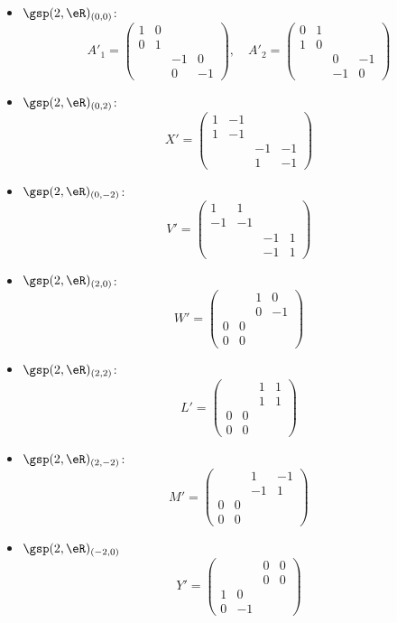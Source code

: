 \begin{itemize}
\item $\gsp(2,\eR)_{(0,0)}$:
\[ 
  A'_1=
\begin{pmatrix}
1&0\\
0&1\\
&&-1&0\\
&&0&-1
\end{pmatrix},
\quad
A'_2=
\begin{pmatrix}
0&1\\
1&0\\
&&0&-1\\
&&-1&0
\end{pmatrix}
\]
\item $\gsp(2,\eR)_{(0,2)}$:
\[ 
 X'= \begin{pmatrix}
1&-1&\\
1&-1&\\
&&-1&-1\\
&&1&-1
\end{pmatrix}
\]
\item $\gsp(2,\eR)_{(0,-2)}$:
\[ 
 V'= \begin{pmatrix}
1&1\\
-1&-1\\
&&-1&1\\
&&-1&1
\end{pmatrix}
\]
\item $\gsp(2,\eR)_{(2,0)}$:
\[ 
 W'= \begin{pmatrix}
&&1&0\\
&&0&-1\\
0&0\\0&0
\end{pmatrix}
\]
\item $\gsp(2,\eR)_{(2,2)}$:
\[ 
  L'=
\begin{pmatrix}
&&1&1\\
&&1&1\\
0&0\\0&0
\end{pmatrix}
\]
\item $\gsp(2,\eR)_{(2,-2)}$:
\[ 
  M'=
\begin{pmatrix}
&&1&-1\\
&&-1&1\\
0&0\\0&0
\end{pmatrix}
\]
\item $\gsp(2,\eR)_{(-2,0)}$
\[ 
Y'=
\begin{pmatrix}
&&0&0\\&&0&0\\
1&0\\0&-1

\end{pmatrix}\]
\end{itemize}
